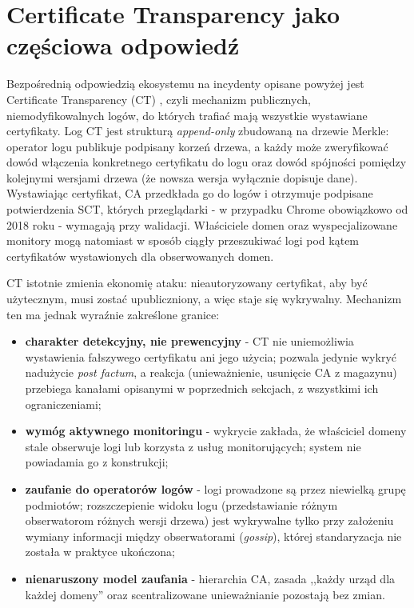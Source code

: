\section{Certificate Transparency jako częściowa odpowiedź}
\label{sec:ct}

Bezpośrednią odpowiedzią ekosystemu na incydenty opisane powyżej jest Certificate Transparency (CT) \cite{rfc6962}, czyli mechanizm publicznych, niemodyfikowalnych logów, do których trafiać mają wszystkie wystawiane certyfikaty. Log CT jest strukturą \emph{append-only} zbudowaną na drzewie Merkle: operator logu publikuje podpisany korzeń drzewa, a każdy może zweryfikować dowód włączenia konkretnego certyfikatu do logu oraz dowód spójności pomiędzy kolejnymi wersjami drzewa (że nowsza wersja wyłącznie dopisuje dane). Wystawiając certyfikat, CA przedkłada go do logów i otrzymuje podpisane potwierdzenia SCT, których przeglądarki - w przypadku Chrome obowiązkowo od 2018 roku - wymagają przy walidacji. Właściciele domen oraz wyspecjalizowane monitory mogą natomiast w sposób ciągły przeszukiwać logi pod kątem certyfikatów wystawionych dla obserwowanych domen.

CT istotnie zmienia ekonomię ataku: nieautoryzowany certyfikat, aby być użytecznym, musi zostać upubliczniony, a więc staje się wykrywalny. Mechanizm ten ma jednak wyraźnie zakreślone granice:
\begin{itemize}
    \item \textbf{charakter detekcyjny, nie prewencyjny} - CT nie uniemożliwia wystawienia fałszywego certyfikatu ani jego użycia; pozwala jedynie wykryć nadużycie \emph{post factum}, a reakcja (unieważnienie, usunięcie CA z magazynu) przebiega kanałami opisanymi w poprzednich sekcjach, z wszystkimi ich ograniczeniami;
    \item \textbf{wymóg aktywnego monitoringu} - wykrycie zakłada, że właściciel domeny stale obserwuje logi lub korzysta z usług monitorujących; system nie powiadamia go z konstrukcji;
    \item \textbf{zaufanie do operatorów logów} - logi prowadzone są przez niewielką grupę podmiotów; rozszczepienie widoku logu (przedstawianie różnym obserwatorom różnych wersji drzewa) jest wykrywalne tylko przy założeniu wymiany informacji między obserwatorami (\emph{gossip}), której standaryzacja nie została w praktyce ukończona;
    \item \textbf{nienaruszony model zaufania} - hierarchia CA, zasada ,,każdy urząd dla każdej domeny'' oraz scentralizowane unieważnianie pozostają bez zmian.
\end{itemize}

